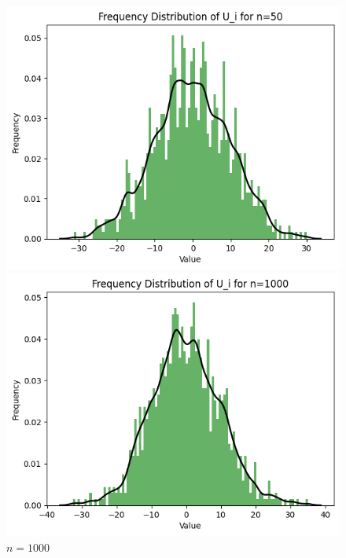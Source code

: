 \documentclass{article}
\begin{document}
\begin{figure}[H]
\begin{minipage}[b]{0.3\linewidth}
        \includegraphics[width=\linewidth]{figure/n=50.png}
        \caption{$n=50$}
    \end{minipage}
    \hfill
    \begin{minipage}[b]{0.3\linewidth}
        \centering
        \includegraphics[width=\linewidth]{figure/n=1000.png}
        \caption{$n=1000$}
    \end{minipage}
    \hfill
    \begin{minipage}[b]{0.3\linewidth}
        \centering

\end{minipage}
\end{figure}
\end{document}
